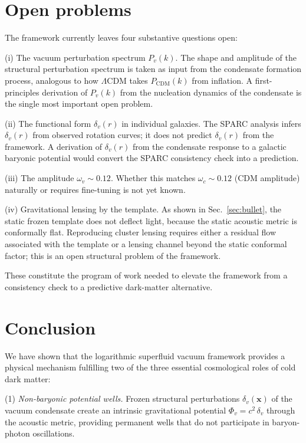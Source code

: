 \documentclass[12pt, a4paper]{article}
\begin{document}
\section{Open problems}
\label{sec:open}

The framework currently leaves four substantive questions open:

(i) The vacuum perturbation spectrum $P_v(k)$. The shape and amplitude of the structural perturbation spectrum is taken as input from the condensate formation process, analogous to how $\Lambda$CDM takes $P_{\mathrm{CDM}}(k)$ from inflation. A first-principles derivation of $P_v(k)$ from the nucleation dynamics of the condensate is the single most important open problem.

(ii) The functional form $\delta_v(r)$ in individual galaxies. The SPARC analysis infers $\delta_v(r)$ from observed rotation curves; it does not predict $\delta_v(r)$ from the framework. A derivation of $\delta_v(r)$ from the condensate response to a galactic baryonic potential would convert the SPARC consistency check into a prediction.

(iii) The amplitude $\omega_v \sim 0.12$. Whether this matches $\omega_c \sim 0.12$ (CDM amplitude) naturally or requires fine-tuning is not yet known.

(iv) Gravitational lensing by the template. As shown in Sec.~\ref{sec:bullet}, the static frozen template does not deflect light, because the static acoustic metric is conformally flat. Reproducing cluster lensing requires either a residual flow associated with the template or a lensing channel beyond the static conformal factor; this is an open structural problem of the framework.

These constitute the program of work needed to elevate the framework from a consistency check to a predictive dark-matter alternative.

\section{Conclusion}
\label{sec:conclusion}

We have shown that the logarithmic superfluid vacuum framework provides a physical mechanism fulfilling two of the three essential cosmological roles of cold dark matter:

(1) \emph{Non-baryonic potential wells.} Frozen structural perturbations $\delta_v(\mathbf{x})$ of the vacuum condensate create an intrinsic gravitational potential $\Phi_v = c^2\,\delta_v$ through the acoustic metric, providing permanent wells that do not participate in baryon-photon oscillations.
\end{document}
